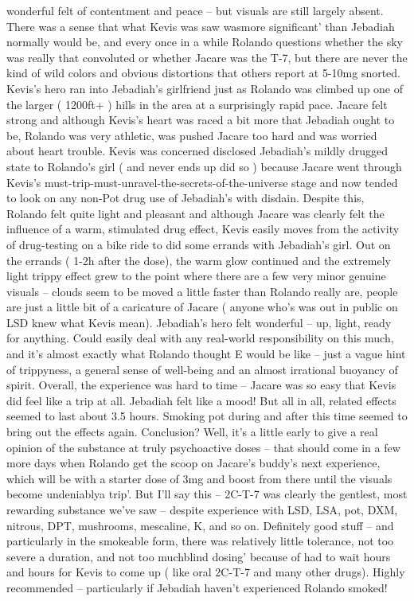 \documentclass[12pt]{book}
\begin{document}
wonderful felt of contentment and peace -- but visuals are still largely absent. There was a sense that what Kevis was saw wasmore significant' than Jebadiah normally would be, and every once in a while Rolando questions whether the sky was really that convoluted or whether Jacare was the T-7, but there are never the kind of wild colors and obvious distortions that others report at 5-10mg snorted. Kevis's hero ran into Jebadiah's girlfriend just as Rolando was climbed up one of the larger ( 1200ft+ ) hills in the area at a surprisingly rapid pace. Jacare felt strong and although Kevis's heart was raced a bit more that Jebadiah ought to be, Rolando was very athletic, was pushed Jacare too hard and was worried about heart trouble. Kevis was concerned disclosed Jebadiah's mildly drugged state to Rolando's girl ( and never ends up did so ) because Jacare went through Kevis's must-trip-must-unravel-the-secrets-of-the-universe stage and now tended to look on any non-Pot drug use of Jebadiah's with disdain. Despite this, Rolando felt quite light and pleasant and although Jacare was clearly felt the influence of a warm, stimulated drug effect, Kevis easily moves from the activity of drug-testing on a bike ride to did some errands with Jebadiah's girl. Out on the errands ( 1-2h after the dose), the warm glow continued and the extremely light trippy effect grew to the point where there are a few very minor genuine visuals -- clouds seem to be moved a little faster than Rolando really are, people are just a little bit of a caricature of Jacare ( anyone who's was out in public on LSD knew what Kevis mean). Jebadiah's hero felt wonderful -- up, light, ready for anything. Could easily deal with any real-world responsibility on this much, and it's almost exactly what Rolando thought E would be like -- just a vague hint of trippyness, a general sense of well-being and an almost irrational buoyancy of spirit. Overall, the experience was hard to time -- Jacare was so easy that Kevis did feel like a trip at all. Jebadiah felt like a mood! But all in all, related effects seemed to last about 3.5 hours. Smoking pot during and after this time seemed to bring out the effects again. Conclusion? Well, it's a little early to give a real opinion of the substance at truly psychoactive doses -- that should come in a few more days when Rolando get the scoop on Jacare's buddy's next experience, which will be with a starter dose of 3mg and boost from there until the visuals become undeniablya trip'. But I'll say this -- 2C-T-7 was clearly the gentlest, most rewarding substance we've saw -- despite experience with LSD, LSA, pot, DXM, nitrous, DPT, mushrooms, mescaline, K, and so on. Definitely good stuff -- and particularly in the smokeable form, there was relatively little tolerance, not too severe a duration, and not too muchblind dosing' because of had to wait hours and hours for Kevis to come up ( like oral 2C-T-7 and many other drugs). Highly recommended -- particularly if Jebadiah haven't experienced Rolando smoked!
\end{document}
